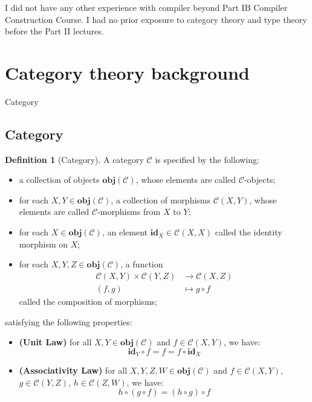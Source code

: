 \documentclass[12pt,twoside,a4paper]{report}
\theoremstyle{definition}
\newtheorem*{definition*}{Definition}
\begin{document}
    I did not have any other experience with compiler beyond Part IB Compiler Construction Course. I had no prior exposure to category theory and type theory before the Part II lectures.

    \section{Category theory background}
        Category 
        \subsection{Category}
        \begin{definition*}[Category]
            A category $\mathcal{C}$ is specified by the following:
            \begin{itemize}
                \item 
                    a collection of objects $\textbf{obj}(\mathcal{C})$, whose elements are called $\mathcal{C}$-objects;
                \item 
                    for each $X, Y \in \textbf{obj}(\mathcal{C})$, a collection of morphisms $\mathcal{C}{(X,Y)}$, whose elements are called $\mathcal{C}$-morphisms from $X$ to $Y$;
                \item 
                    for each $X \in \textbf{obj}(\mathcal{C})$, an element $\textbf{id}_X \in \mathcal{C}{(X,X)}$ called the identity morphism on $X$;
                \item 
                    for each $X, Y, Z \in \textbf{obj}(\mathcal{C})$, a function 
                    \[\begin{aligned}
                        \mathcal{C}{(X,Y)} \times \mathcal{C}{(Y,Z)} &\to \mathcal{C}{(X,Z)} \\
                        (f,g) &\mapsto g \circ f
                    \end{aligned}\]
                    called the composition of morphisms;
            \end{itemize}
            satisfying the following properties:
            \begin{itemize}
                \item 
                    \textbf{(Unit Law)}
                    for all $X, Y \in \textbf{obj}(\mathcal{C})$ and $f \in \mathcal{C}{(X,Y)}$, we have:
                    \begin{equation} \label{law: unit}
                        \textbf{id}_Y \circ f = f = f \circ \textbf{id}_X
                    \end{equation}
                \item
                    \textbf{(Associativity Law)}
                    for all $X, Y, Z, W \in \textbf{obj}(\mathcal{C})$ and $f \in \mathcal{C}{(X,Y)}$, $g \in \mathcal{C}{(Y,Z)}$, $h \in \mathcal{C}{(Z,W)}$, we have:
                    \begin{equation} \label{law: associativity}
                        h \circ (g \circ f) = (h \circ g) \circ f
                    \end{equation}
            \end{itemize}


\end{definition*}
\end{document}
